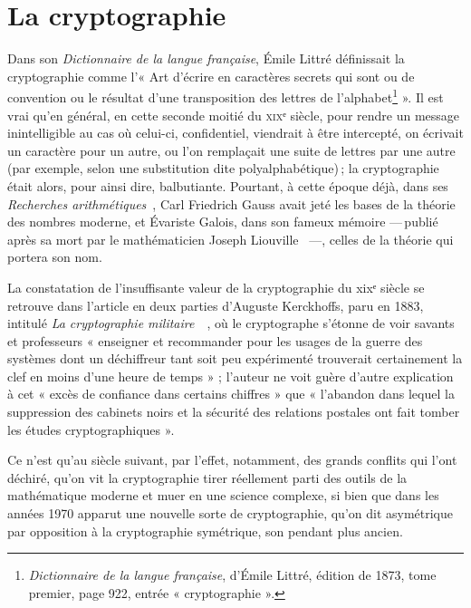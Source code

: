 
\renewcommand*{\UrlFont}{\ttfamily\smaller\relax}

\section{La cryptographie} %
\label{sec:cryptographie}


Dans son \emph{Dictionnaire de la langue française}, Émile Littré définissait la cryptographie comme
l’« Art d'écrire en caractères secrets qui sont ou de convention ou le résultat d'une transposition
des lettres de l'alphabet\footnote{\emph{Dictionnaire de la langue française}, d’Émile Littré,
édition de 1873, tome premier, page 922, entrée « cryptographie ».} ».
Il est vrai qu’en général, en cette seconde moitié  du \textsc{xix}ᵉ siècle, pour rendre un message
inintelligible au cas où celui-ci, confidentiel, viendrait à être intercepté, on écrivait un
caractère pour un autre, ou l’on remplaçait une suite de lettres par une autre (par exemple, selon une
substitution dite polyalphabétique) ; la cryptographie était alors, pour ainsi dire, balbutiante.
Pourtant, à cette époque déjà, dans ses \emph{Recherches arithmétiques}~\cite{gauss1801}, Carl Friedrich
Gauss avait jeté les bases de la théorie des nombres moderne, et Évariste Galois, dans son fameux
mémoire --- publié après sa mort par le mathématicien Joseph Liouville~\cite{galois1846} ---,
celles de la théorie qui portera son nom.

La constatation de l’insuffisante valeur de la cryptographie du {\sc xix}ᵉ siècle se retrouve dans
l’article en deux parties d’Auguste Kerckhoffs, paru en 1883, intitulé \emph{La cryptographie
militaire}~\cite{kerckhoffs1883premier}~\cite{kerckhoffs1883second}, où le cryptographe s’étonne de voir savants et professeurs « enseigner et
recommander pour les usages de la guerre des systèmes dont un déchiffreur tant soit peu expérimenté
trouverait certainement la clef en moins d’une heure de temps » ; l’auteur ne voit guère
d’autre explication à cet « excès de confiance dans certains chiffres » que « l’abandon dans lequel la
suppression des cabinets noirs et la sécurité des relations postales ont fait tomber les études
cryptographiques ».

Ce n’est qu’au siècle suivant, par l’effet, notamment, des grands conflits qui l’ont déchiré,
qu’on vit la cryptographie tirer réellement parti des outils de la mathématique moderne et muer en
une science complexe, si bien que dans les années 1970 apparut une nouvelle sorte de cryptographie,
qu’on dit asymétrique par opposition à la cryptographie symétrique, son pendant plus ancien.

